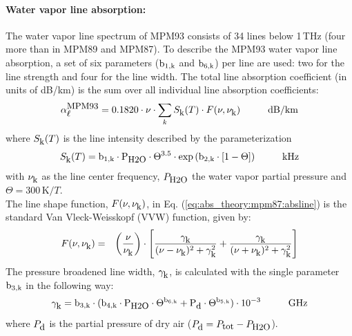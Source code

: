 \paragraph{Water vapor line absorption:}
\label{levele:mpm93_h2olines}
The water vapor line spectrum of MPM93 \citep{liebeetal:93} 
consists of 34 lines below 1\,THz (four more than in MPM89 and MPM87). 
To describe the MPM93 water vapor line absorption, a set of six parameters 
($\rm b_{\rm 1,k}$ and $\rm b_{\rm 6,k}$) per line are used: two for the line strength and 
four for the line width. The total line absorption coefficient 
(in units of dB/km) is the sum over all individual line absorption 
coefficients:
\begin{equation}
  \label{eq:abs_theory:mpm93:absline}
  \alphampmnl = 0.1820 \cdot \nu \cdot
  \sum_{k}{\inten \cdot \shape}\hspace*{10mm}\mbox{dB/km}
\end{equation}
where $S_{\mbox{\rm \small k}}(T)$ is the line intensity described by the parameterization
\begin{equation}
  \label{eq:abs_theory:mpm93:strength}
  \inten = \bek \cdot \phzo \cdot \Theta^{3.5} 
           \cdot \exp{(\bzk \cdot [1-\Theta])}\hspace*{10mm}\mbox{kHz}
\end{equation}
with $\nu_{\mbox{\rm \small k}}$ as the line center frequency, $P_{\mbox{\rm \small H2O}}$ the water
vapor partial pressure and $\Theta = 300\,\mbox{K}/T$.\\
The line shape function, $F(\nu,\nu_{\mbox{\rm \small k}})$, in Eq. (\ref{eq:abs_theory:mpm87:absline}) 
is the standard Van Vleck-Weisskopf (VVW) function, given by:
\begin{eqnarray}
  \label{eq:abs_theory:mpm93:VVW}
  F(\nu,\nu_{\mbox{\rm \small k}}) & = & \left(\frac{\nu}{\nu_{\mbox{\rm \small k}}}\right) \cdot 
               \left[\frac{\gamma_{\mbox{\rm \small k}}}{(\nu - \nu_{\mbox{\rm \small k}})^2 + \gamma_{\mbox{\rm \small k}}^2} + 
                     \frac{\gamma_{\mbox{\rm \small k}}}{(\nu + \nu_{\mbox{\rm \small k}})^2 + \gamma_{\mbox{\rm \small k}}^2}\right]\\
\end{eqnarray}
The pressure broadened line width, $\gamma_{\mbox{\rm \small k}}$, is calculated with the 
single parameter $\rm b_{\rm 3,k}$ in the following way:
\begin{equation}
  \label{eq:abs_theory:mpm93:gamma}
  \gamk = \bdk \cdot 
         (\bvk \cdot \phzo \cdot \Theta^{\bsk} +
                     \pda  \cdot \Theta^{\bfk})
        \cdot 10^{-3}\hspace*{10mm}\mbox{GHz}
\end{equation}
where $P_{\mbox{\rm \small d}}$ is the partial pressure of dry air ($P_{\mbox{\rm \small d}}=P_{\mbox{\rm \small tot}}-P_{\mbox{\rm \small H2O}}$). 

